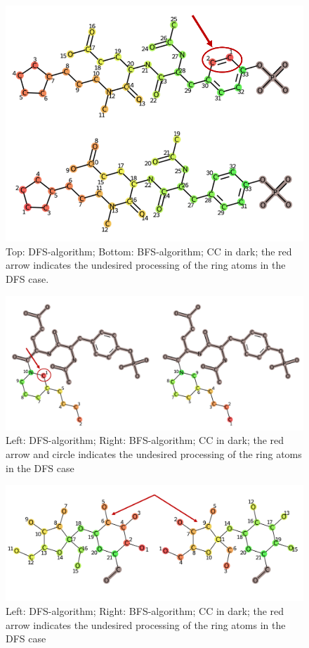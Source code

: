 \begin{figure}
\includegraphics[scale=0.7]{simple_ring_exampledfs2_two_rows}\caption{Top: DFS-algorithm; Bottom: BFS-algorithm; CC in dark; the
red arrow indicates the undesired processing of the ring atoms in the DFS case.}
\label{fig:simple_ring_exampledfs2}
\end{figure}

\begin{figure}
\includegraphics[scale=1.3]{simple_ring_exampledfs3}\caption{Left: DFS-algorithm; Right: BFS-algorithm; CC in dark; the
red arrow and circle indicates the undesired processing of the ring
atoms in the DFS case}
\label{fig:simple_ring_exampledfs3}
\end{figure}
\begin{figure}

\includegraphics[scale=0.5]{simple_ring_exampledfs4}\caption{Left: DFS-algorithm; Right: BFS-algorithm; CC in dark; the
red arrow indicates the undesired processing of the ring atoms in the DFS case}
\label{fig:simple_ring_exampledfs4}
\end{figure}

